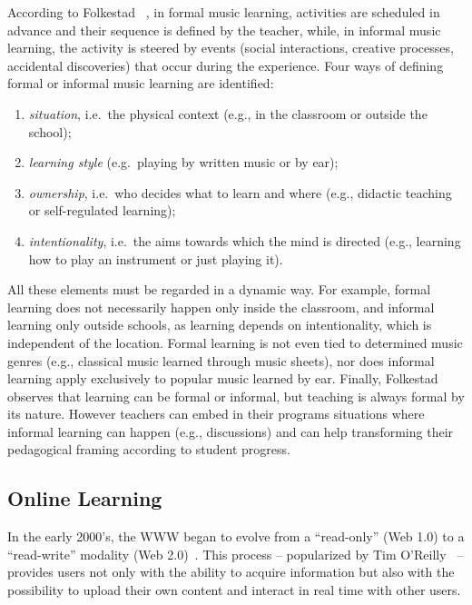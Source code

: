 \documentclass[10pt,journal,compsoc]{IEEEtran}
\begin{document}
According to Folkestad ~\cite{folkestad2006formal}, in formal music learning, activities are scheduled in advance and their sequence is defined by the teacher, while, in informal music learning, the activity is steered by events (social interactions, creative processes, accidental discoveries) that occur during the experience.
Four ways of defining formal or informal music learning are identified: 

\begin{enumerate}
	\item \textit{situation}, i.e.\ the physical context (e.g., in the classroom or outside the school);
	\item \textit{learning style} (e.g.\ playing by written music or by ear);
	\item \textit{ownership}, i.e.\ who decides what to learn and where (e.g., didactic teaching or self-regulated learning);
	\item \textit{intentionality}, i.e.\ the aims towards which the mind is directed (e.g., learning how to play an instrument or just playing it).
\end{enumerate}

All these elements must be regarded in a dynamic way. For example, formal learning does not necessarily happen only inside the classroom, and informal learning only outside schools, as learning depends on intentionality, which is independent of the location. Formal learning is not even tied to determined music genres (e.g., classical music learned through music sheets), nor does informal learning apply exclusively to popular music learned by ear. Finally, Folkestad~\cite{folkestad2006formal} observes that learning can be formal or informal, but teaching is always formal by its nature. However teachers can embed in their programs situations where informal learning can happen (e.g., discussions) and can help transforming their pedagogical framing according to student progress.


\subsection{Online Learning}
\label{subsec:OL}
In the early 2000's, the WWW began to evolve from a ``read-only'' (Web 1.0) to a ``read-write'' modality (Web 2.0)~\cite{salavuo2008social}. This process -- popularized by Tim O'Reilly~\cite{oreilly} -- provides users not only with the ability to acquire information but also with the possibility to upload their own content and interact in real time with other users.  
\end{document}

